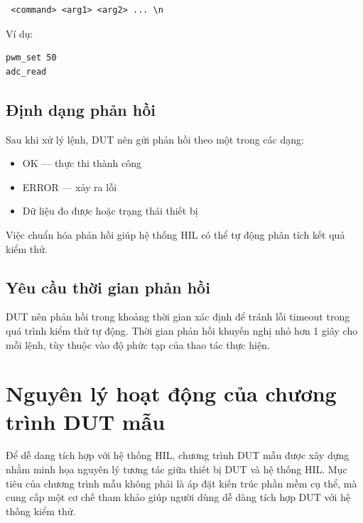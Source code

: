 \begin{verbatim} <command> <arg1> <arg2> ... \n
\end{verbatim}

Ví dụ:

\begin{verbatim}
pwm_set 50
adc_read
\end{verbatim}

\subsection{Định dạng phản hồi}

Sau khi xử lý lệnh, DUT nên gửi phản hồi theo một trong các dạng:

\begin{itemize}
\item OK — thực thi thành công
\item ERROR — xảy ra lỗi
\item Dữ liệu đo được hoặc trạng thái thiết bị
\end{itemize}

Việc chuẩn hóa phản hồi giúp hệ thống HIL có thể tự động phân tích kết quả kiểm thử.

\subsection{Yêu cầu thời gian phản hồi}

DUT nên phản hồi trong khoảng thời gian xác định để tránh lỗi timeout trong quá trình kiểm thử tự động. Thời gian phản hồi khuyến nghị nhỏ hơn 1 giây cho mỗi lệnh, tùy thuộc vào độ phức tạp của thao tác thực hiện.

\section{Nguyên lý hoạt động của chương trình DUT mẫu}

Để dễ dang tích hợp với hệ thống HIL, chương trình DUT mẫu được xây dựng nhằm minh họa nguyên lý tương tác giữa thiết bị DUT và hệ thống HIL. Mục tiêu của chương trình mẫu không phải là áp đặt kiến trúc phần mềm cụ thể, mà cung cấp một cơ chế tham khảo giúp người dùng dễ dàng tích hợp DUT với hệ thống kiểm thử.

